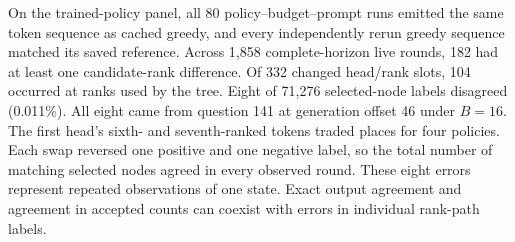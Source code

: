 On the trained-policy panel, all 80 policy--budget--prompt runs emitted the same token sequence as cached greedy, and every independently rerun greedy sequence matched its saved reference. Across 1,858 complete-horizon live rounds, 182 had at least one candidate-rank difference. Of 332 changed head/rank slots, 104 occurred at ranks used by the tree. Eight of 71,276 selected-node labels disagreed (0.011\%). All eight came from question 141 at generation offset 46 under $B=16$. The first head's sixth- and seventh-ranked tokens traded places for four policies. Each swap reversed one positive and one negative label, so the total number of matching selected nodes agreed in every observed round. These eight errors represent repeated observations of one state. Exact output agreement and agreement in accepted counts can coexist with errors in individual rank-path labels.
